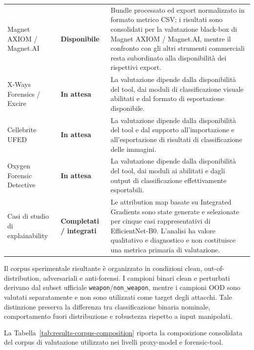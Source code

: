 \begin{table}[H]
\begin{tabularx}{\textwidth}{@{}l l X@{}}
Magnet AXIOM / Magnet.AI
&
\textbf{Disponibile}
&
Bundle processato ed export normalizzato in formato metrico CSV; i risultati
sono consolidati per la valutazione black-box di Magnet AXIOM / Magnet.AI,
mentre il confronto con gli altri strumenti commerciali resta subordinato alla
disponibilità dei rispettivi export. \\

X-Ways Forensics / Excire
&
\textbf{In attesa}
&
La valutazione dipende dalla disponibilità del tool, dai moduli di
classificazione visuale abilitati e dal formato di esportazione disponibile. \\

Cellebrite UFED
&
\textbf{In attesa}
&
La valutazione dipende dalla disponibilità del tool e dal supporto
all'importazione e all'esportazione di risultati di classificazione delle
immagini. \\

Oxygen Forensic Detective
&
\textbf{In attesa}
&
La valutazione dipende dalla disponibilità del tool, dai moduli \gls{ai}
abilitati e dagli output di classificazione effettivamente esportabili. \\

Casi di studio di explainability
&
\textbf{Completati / integrati}
&
Le attribution map basate su Integrated Gradients sono state generate e
selezionate per cinque casi rappresentativi di EfficientNet-B0. L'analisi ha
valore qualitativo e diagnostico e non costituisce una metrica primaria di
valutazione. \\

\bottomrule
\end{tabularx}
\end{table}

Il corpus sperimentale risultante è organizzato in condizioni clean,
out-of-distribution, adversariali e anti-forensi. I campioni binari clean e
perturbati derivano dal subset ufficiale \texttt{weapon}/\texttt{non\_weapon},
mentre i campioni OOD sono valutati separatamente e non sono utilizzati come
target degli attacchi. Tale distinzione preserva la differenza tra classificazione
binaria nominale, comportamento fuori distribuzione e robustezza rispetto a input
manipolati.

La Tabella~\ref{tab:results-corpus-composition} riporta la composizione
consolidata del corpus di valutazione utilizzato nei livelli proxy-model e
forensic-tool.

